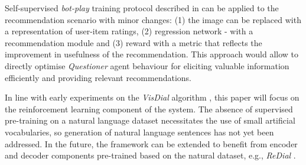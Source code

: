 Self-supervised \textit{bot-play} training protocol described in \citep{das2017learning} can be applied to the recommendation scenario with minor changes: (1) the image can be replaced with a representation of user-item ratings, (2)  regression network - with a recommendation module and (3) reward with a metric that reflects the improvement in usefulness of the recommendation. This approach would allow to directly optimise \textit{Questioner} agent behaviour for eliciting valuable information efficiently and providing relevant recommendations.

In line with early experiments on the \textit{VisDial} algorithm \citep{kottur2017natural}, this paper will focus on the reinforcement learning component of the system. The absence of supervised pre-training on a natural language dataset necessitates the use of small artificial vocabularies, so generation of natural language sentences has not yet been addressed. In the future, the framework can be extended to benefit from encoder and decoder components pre-trained based on the natural dataset, e.g., \textit{ReDial} \citep{li2018towards}.
